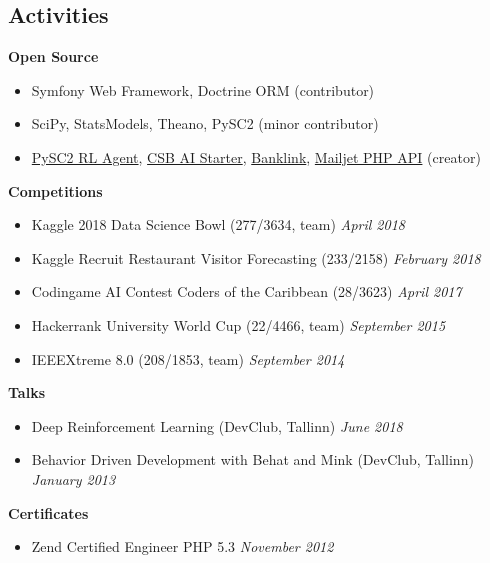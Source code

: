 \documentclass[margin,line]{res}
\begin{document}
\begin{resume}
\section{\sc Activities}
{\bf Open Source}
\begin{itemize}
    \item[ ] Symfony Web Framework, Doctrine ORM (contributor)
    \item[ ] SciPy, StatsModels, Theano, PySC2 (minor contributor)
    \item[ ] \href{https://github.com/Inoryy/pysc2-rl-agent}{PySC2 RL Agent}, \href{https://github.com/Inoryy/csb-ai-starter}{CSB AI Starter}, \href{https://github.com/Inoryy/Banklink}{Banklink}, \href{https://github.com/KnpLabs/mailjet-api-php}{Mailjet PHP API} (creator)
\end{itemize}
\vspace*{-.1in}
{\bf Competitions}
\begin{itemize}
\item[ ] Kaggle 2018 Data Science Bowl (277/3634, team) \hfill {\it April 2018}
\item[ ] Kaggle Recruit Restaurant Visitor Forecasting (233/2158) \hfill {\it February 2018}
\item[ ] Codingame AI Contest Coders of the Caribbean (28/3623) \hfill {\it April 2017}
\item[ ] Hackerrank University World Cup (22/4466, team) \hfill {\it September 2015}
\item[ ] IEEEXtreme 8.0 (208/1853, team) \hfill {\it September 2014}
\end{itemize}
\vspace*{-.1in}
{\bf Talks}
\begin{itemize}
    \item[ ] Deep Reinforcement Learning (DevClub, Tallinn) \hfill {\it June 2018}
    \item[ ] Behavior Driven Development with Behat and Mink (DevClub, Tallinn) \hfill {\it January 2013}
\end{itemize}
\vspace*{-.1in}
{\bf Certificates}
\begin{itemize}
    \item[ ] Zend Certified Engineer PHP 5.3 \hfill {\it November 2012}
\end{itemize}


\end{resume}
\end{document}
